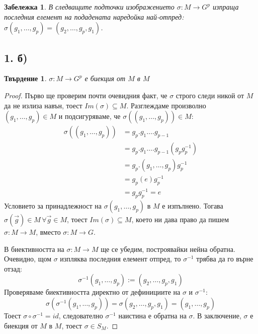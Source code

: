 \documentclass{article}
\newtheorem*{prop}{Твърдение}
\newtheorem*{remark}{Забележка}
\begin{document}
\begin{remark}
    В следващите подточки изображението $\sigma : M \to G^p$ изпраща последния елемент на подадената наредойка най-отпред: $\sigma (g_1, \dots, g_p) = (g_2, \dots, g_p, g_1)$.
\end{remark}

\subsection*{1. б)}
\begin{prop}
    $\sigma : M \to G^p$ е биекция от $M$ в $M$
\end{prop}
\begin{proof}
    Първо ще проверим почти очевидния факт, че $\sigma$ строго следи никой от $M$ да не излиза навън, тоест $Im(\sigma) \subseteq M$.
    Разглеждаме произволно $(g_1,\dots, g_p) \in M$ и подсигуряваме, че ${\sigma((g_1,\dots, g_p)) \in M}$:
    \begin{align*}
        \sigma((g_1,\dots, g_p)) &= g_p.g_1\dots.g_{p-1}\\
        &= g_p.g_1\dots.g_{p-1}(g_p g_p^{-1})\\
        &= g_p.(g_1,\dots, g_p)g_p^{-1}\\
        &= g_p(e)g_p^{-1} \\
        &= g_p g_p^{-1} = e
    \end{align*}
    Условието за принадлежност на $\sigma (g_1,\dots, g_p)$ в $M$ е изпълнено.
    Тогава $\sigma(\vec g) \in M \, \forall \vec g \in M$, тоест $Im(\sigma) \subseteq M$, което ни дава право да пишем $\sigma : M \to M$, вместо $\sigma : M \to G$.

    В биективността на $\sigma : M \to M$ ще се убедим, построявайки нейна обратна. Очевидно, щом $\sigma$ изпляква последния елемент отпред, то $\sigma^{-1}$ трябва да го върне отзад:
    \begin{equation*}
        \sigma^{-1}(g_1, \dots, g_p) := (g_2, \dots, g_p, g_1)
    \end{equation*}
    Проверяваме биективността директно от дефинициите на $\sigma$ и $\sigma^{-1}$:
    \begin{equation*}
        \sigma(\sigma^{-1}(g_1,\dots,g_p)) = \sigma(g_2,\dots,g_p,g_1) = (g_1, \dots, g_p)
    \end{equation*}
    Тоест $\sigma \circ \sigma^{-1} = id$, следователно $\sigma^{-1}$ наистина е обратна на $\sigma$. В заключение, $\sigma$ е биекция от $M$ в $M$, тоест $\sigma \in S_M$.
\end{proof}
\end{document}
